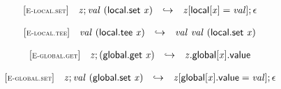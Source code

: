 $$
\begin{array}{@{}l@{}lcl@{}l@{}}
{[\textsc{\scriptsize E{-}local.set}]} \quad & {\mathit{z}} ; {\mathit{val}}~(\mathsf{local.set}~{\mathit{x}}) &\hookrightarrow& {\mathit{z}}[\mathsf{local}[{\mathit{x}}] = {\mathit{val}}] ; \epsilon &  \\
\end{array}
$$

$$
\begin{array}{@{}l@{}lcl@{}l@{}}
{[\textsc{\scriptsize E{-}local.tee}]} \quad & {\mathit{val}}~(\mathsf{local.tee}~{\mathit{x}}) &\hookrightarrow& {\mathit{val}}~{\mathit{val}}~(\mathsf{local.set}~{\mathit{x}}) &  \\
\end{array}
$$

\vspace{1ex}

$$
\begin{array}{@{}l@{}lcl@{}l@{}}
{[\textsc{\scriptsize E{-}global.get}]} \quad & {\mathit{z}} ; (\mathsf{global.get}~{\mathit{x}}) &\hookrightarrow& {{\mathit{z}}.\mathsf{global}}{[{\mathit{x}}]}.\mathsf{value} &  \\
\end{array}
$$

$$
\begin{array}{@{}l@{}lcl@{}l@{}}
{[\textsc{\scriptsize E{-}global.set}]} \quad & {\mathit{z}} ; {\mathit{val}}~(\mathsf{global.set}~{\mathit{x}}) &\hookrightarrow& {\mathit{z}}[\mathsf{global}[{\mathit{x}}].\mathsf{value} = {\mathit{val}}] ; \epsilon &  \\
\end{array}
$$

\vspace{1ex}

